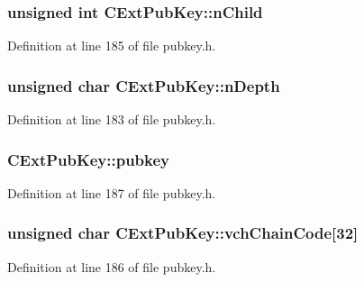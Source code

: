 \subsubsection[{n\+Child}]{\setlength{\rightskip}{0pt plus 5cm}unsigned int C\+Ext\+Pub\+Key\+::n\+Child}\label{struct_c_ext_pub_key_af816bc2798e9d9aaa94f56af4775d9bf}


Definition at line 185 of file pubkey.\+h.

\hypertarget{struct_c_ext_pub_key_a58a0724855654eab688cdb00738e3dba}{}
\subsubsection[{n\+Depth}]{\setlength{\rightskip}{0pt plus 5cm}unsigned char C\+Ext\+Pub\+Key\+::n\+Depth}\label{struct_c_ext_pub_key_a58a0724855654eab688cdb00738e3dba}


Definition at line 183 of file pubkey.\+h.

\hypertarget{struct_c_ext_pub_key_ab18c8520919d20bbfd068565ae566ea8}{}
\subsubsection[{pubkey}]{ C\+Ext\+Pub\+Key\+::pubkey}\label{struct_c_ext_pub_key_ab18c8520919d20bbfd068565ae566ea8}


Definition at line 187 of file pubkey.\+h.

\hypertarget{struct_c_ext_pub_key_a208836888dcc295ca1510de459ca1fc7}{}
\subsubsection[{vch\+Chain\+Code}]{\setlength{\rightskip}{0pt plus 5cm}unsigned char C\+Ext\+Pub\+Key\+::vch\+Chain\+Code\mbox{[}32\mbox{]}}\label{struct_c_ext_pub_key_a208836888dcc295ca1510de459ca1fc7}


Definition at line 186 of file pubkey.\+h.

\hypertarget{struct_c_ext_pub_key_a57101a84d16d7897bcec224e488143d9}{}
